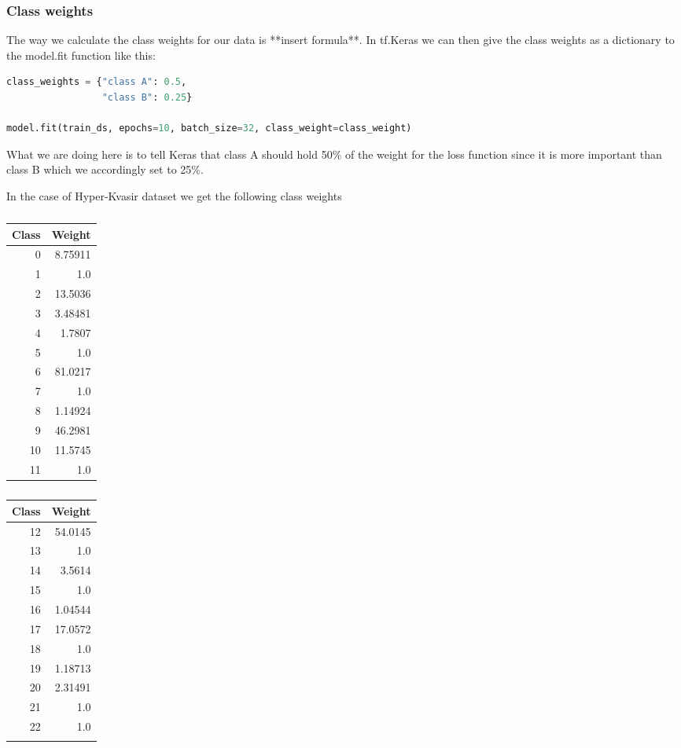 \documentclass[thesis.tex]{subfiles}
\begin{document}
\subsubsection{Class weights}
The way we calculate the class weights for our data is **insert formula**. In tf.Keras we can then give the class weights as a dictionary to the model.fit function like this:

\begin{lstlisting}[language=Python]
class_weights = {"class A": 0.5,
				 "class B": 0.25}
				 
model.fit(train_ds, epochs=10, batch_size=32, class_weight=class_weight)
\end{lstlisting}

What we are doing here is to tell Keras that class A should hold 50\% of the weight for the loss function since it is more important than class B which we accordingly set to 25\%.

In the case of Hyper-Kvasir dataset we get the following class weights

\begin{table} %
  \centering
  \begin{tabular}{rr}
	\hline
   Class &   Weight \\
	\hline
       0 &  8.75911 \\
       1 &  1.0     \\
       2 & 13.5036  \\
       3 &  3.48481 \\
       4 &  1.7807  \\
       5 &  1.0     \\
       6 & 81.0217  \\
       7 &  1.0     \\
       8 &  1.14924 \\
       9 & 46.2981  \\
      10 & 11.5745  \\
      11 &  1.0     \\
	\hline
  \end{tabular}
  \quad
  \begin{tabular}{rr}
	\hline
   Class &   Weight \\
	\hline
      12 & 54.0145  \\
      13 &  1.0     \\
      14 &  3.5614  \\
      15 &  1.0     \\
      16 &  1.04544 \\
      17 & 17.0572  \\
      18 &  1.0     \\
      19 &  1.18713 \\
      20 &  2.31491 \\
      21 &  1.0     \\
      22 &  1.0     \\
      & \\
	\hline
  \end{tabular}
  \caption[]{}
  \label{table:}
\end{table}
\end{document}
